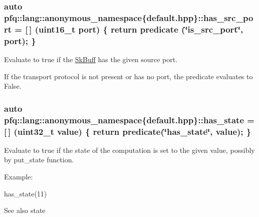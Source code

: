 \subsubsection[{\texorpdfstring{has\+\_\+src\+\_\+port}{has_src_port}}]{\setlength{\rightskip}{0pt plus 5cm}auto pfq\+::lang\+::anonymous\+\_\+namespace\{default.\+hpp\}\+::has\+\_\+src\+\_\+port = \mbox{[}$\,$\mbox{]} (uint16\+\_\+t {\bf port}) \{ return {\bf predicate} (\char`\"{}is\+\_\+src\+\_\+port\char`\"{}, port); \}}\hypertarget{namespacepfq_1_1lang_1_1anonymous__namespace_02default_8hpp_03_a964d5ed41f50a1f3a04176f8e54d7a5a}{}\label{namespacepfq_1_1lang_1_1anonymous__namespace_02default_8hpp_03_a964d5ed41f50a1f3a04176f8e54d7a5a}


Evaluate to {\ttfamily true} if the \hyperlink{structpfq_1_1lang_1_1SkBuff}{Sk\+Buff} has the given source port. 

If the transport protocol is not present or has no port, the predicate evaluates to False. 
\subsubsection[{\texorpdfstring{has\+\_\+state}{has_state}}]{\setlength{\rightskip}{0pt plus 5cm}auto pfq\+::lang\+::anonymous\+\_\+namespace\{default.\+hpp\}\+::has\+\_\+state = \mbox{[}$\,$\mbox{]} (uint32\+\_\+t value) \{ return {\bf predicate}(\char`\"{}has\+\_\+state\char`\"{}, value); \}}\hypertarget{namespacepfq_1_1lang_1_1anonymous__namespace_02default_8hpp_03_a8efacc41a17e01f17a25e8fc1d784c74}{}\label{namespacepfq_1_1lang_1_1anonymous__namespace_02default_8hpp_03_a8efacc41a17e01f17a25e8fc1d784c74}


Evaluate to {\ttfamily true} if the state of the computation is set to the given {\ttfamily value}, possibly by put\+\_\+state function. 

Example\+:

has\+\_\+state(11)

\begin{DoxySeeAlso}{See also}
state 
\end{DoxySeeAlso}
